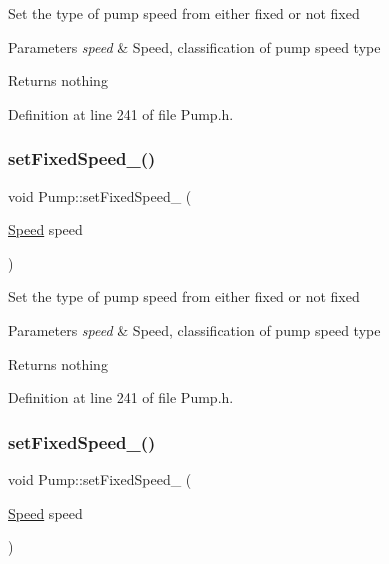 Set the type of pump speed from either fixed or not fixed


\begin{DoxyParams}{Parameters}
{\em speed} & Speed, classification of pump speed type\\
\hline
\end{DoxyParams}
\begin{DoxyReturn}{Returns}
nothing 
\end{DoxyReturn}


Definition at line 241 of file Pump.\+h.

\mbox{\label{class_pump_a9e74b484f468a14076fb12d8b991e24b}} 
\subsubsection{\texorpdfstring{set\+Fixed\+Speed\+\_\+()}{setFixedSpeed\_()}\hspace{0.1cm}{\footnotesize\ttfamily [2/3]}}
{\footnotesize\ttfamily void Pump\+::set\+Fixed\+Speed\+\_\+ (\begin{DoxyParamCaption}\item[{\hyperlink{class_pump_ae443603074ebca82f0b89209482d10b6}{Speed}}]{speed }\end{DoxyParamCaption})\hspace{0.3cm}{\ttfamily [inline]}}

Set the type of pump speed from either fixed or not fixed


\begin{DoxyParams}{Parameters}
{\em speed} & Speed, classification of pump speed type\\
\hline
\end{DoxyParams}
\begin{DoxyReturn}{Returns}
nothing 
\end{DoxyReturn}


Definition at line 241 of file Pump.\+h.

\mbox{\label{class_pump_a9e74b484f468a14076fb12d8b991e24b}} 
\subsubsection{\texorpdfstring{set\+Fixed\+Speed\+\_\+()}{setFixedSpeed\_()}\hspace{0.1cm}{\footnotesize\ttfamily [3/3]}}
{\footnotesize\ttfamily void Pump\+::set\+Fixed\+Speed\+\_\+ (\begin{DoxyParamCaption}\item[{\hyperlink{class_pump_ae443603074ebca82f0b89209482d10b6}{Speed}}]{speed }\end{DoxyParamCaption})\hspace{0.3cm}{\ttfamily [inline]}}


